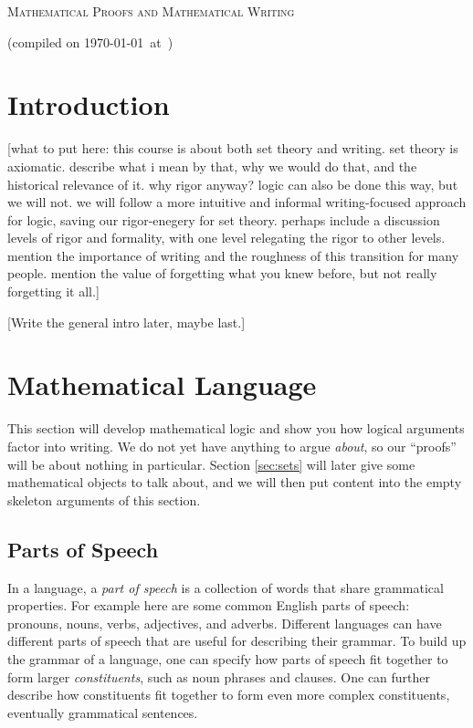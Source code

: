 \documentclass[12pt]{article}
\newcommand{\note}[1]{[#1]}
\begin{document}
\begin{center} {\Large \scshape Mathematical Proofs and Mathematical Writing}
\end{center}
(compiled on \today\ at\ \currenttime)
\hfill

\tableofcontents

\section{Introduction}

\note{what to put here:
this course is about both set theory and writing.
set theory is axiomatic. describe what i mean by that, why we would do that, and the historical relevance of it.
why rigor anyway?
logic can also be done this way, but we will not.
we will follow a more intuitive and informal writing-focused approach for logic,
saving our rigor-enegery for set theory.
perhaps include a discussion levels of rigor and formality, with one level relegating the rigor to other levels.
mention the importance of writing and the roughness of this transition for many people.
mention the value of forgetting what you knew before, but not really forgetting it all.}

\note{Write the general intro later, maybe last.}



\section{Mathematical Language}
\label{sec:logic}

This section will develop mathematical logic and show you how logical arguments factor into writing.
We do not yet have anything to argue \emph{about}, so our ``proofs'' will be about nothing in particular.
Section \ref{sec:sets} will later give some mathematical objects to talk about, and we will then put
content into the empty skeleton arguments of this section.

\subsection{Parts of Speech}

In a language, a \emph{part of speech} is a collection of words that share grammatical properties.
For example here are some common English parts of speech: pronouns, nouns, verbs, adjectives, and adverbs.
Different languages can have different parts of speech that are useful for describing their grammar.
To build up the grammar of a language, one can specify how parts of speech fit together to form larger
\emph{constituents}, such as noun phrases and clauses. One can further describe how
constituents fit together to form even more complex constituents, eventually grammatical sentences.
\end{document}

